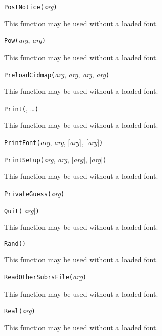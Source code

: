 
\noindent\texttt{PostNotice(}\textit{arg}\texttt{)}

This function may be used without a loaded font.


\noindent\texttt{Pow(}\textit{arg}, \textit{arg}\texttt{)}

This function may be used without a loaded font.


\noindent\texttt{PreloadCidmap(}\textit{arg}, \textit{arg}, \textit{arg}, \textit{arg}\texttt{)}

This function may be used without a loaded font.


\noindent\texttt{Print(}, \ldots\texttt{)}

This function may be used without a loaded font.


\noindent\texttt{PrintFont(}\textit{arg}, \textit{arg}, [\textit{arg}], [\textit{arg}]\texttt{)}


\noindent\texttt{PrintSetup(}\textit{arg}, \textit{arg}, [\textit{arg}], [\textit{arg}]\texttt{)}

This function may be used without a loaded font.


\noindent\texttt{PrivateGuess(}\textit{arg}\texttt{)}


\noindent\texttt{Quit(}[\textit{arg}]\texttt{)}

This function may be used without a loaded font.


\noindent\texttt{Rand(}\texttt{)}

This function may be used without a loaded font.


\noindent\texttt{ReadOtherSubrsFile(}\textit{arg}\texttt{)}

This function may be used without a loaded font.


\noindent\texttt{Real(}\textit{arg}\texttt{)}

This function may be used without a loaded font.

